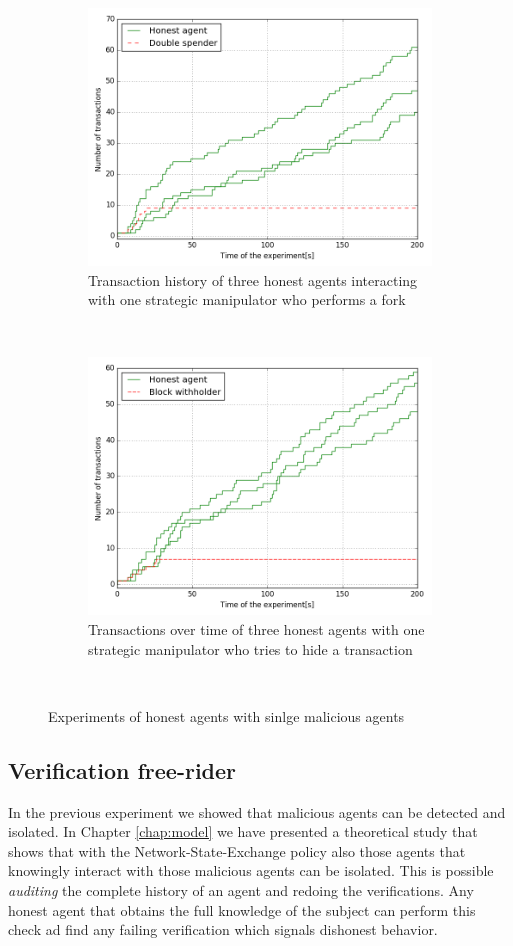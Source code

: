 \begin{figure}
    \begin{subfigure}{\textwidth}
      \centering
      \includegraphics[width=.7\linewidth]{images/double_spending}
      \caption{Transaction history of three honest agents interacting with one strategic manipulator who performs a fork}
      \label{fig:forking}
    \end{subfigure}\\
    \begin{subfigure}{\textwidth}
      \centering
      \includegraphics[width=.7\linewidth]{images/transaction_hiding}
      \caption{Transactions over time of three honest agents with one strategic manipulator who tries to hide a transaction}
      \label{fig:DFR_empty_exchanges}
    \end{subfigure}\\
    \caption{Experiments of honest agents with sinlge malicious agents}
    \label{fig:malicious}
\end{figure}

\subsection{Verification free-rider}
In the previous experiment we showed that malicious agents can be detected and isolated. In Chapter
\ref{chap:model} we have presented a theoretical study that shows that with the Network-State-Exchange
policy also those agents that knowingly interact with those malicious agents can
be isolated. This is possible \textit{auditing} the complete history of an agent and redoing the 
verifications. Any honest agent that obtains the full knowledge of the subject can perform this check 
ad find any failing verification which signals dishonest behavior.

